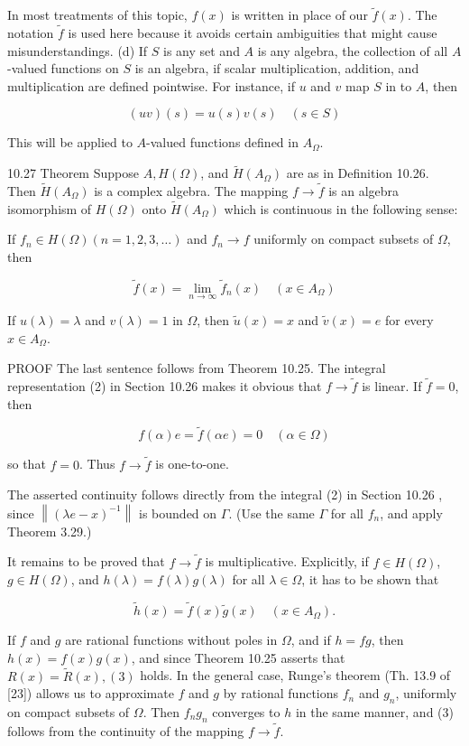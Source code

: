 \documentclass[10pt]{article}
\begin{document}
In most treatments of this topic, $f(x)$ is written in place of our $\tilde{f}(x)$. The notation $\tilde{f}$ is used here because it avoids certain ambiguities that might cause misunderstandings.
(d) If $S$ is any set and $A$ is any algebra, the collection of all $A$-valued functions on $S$ is an algebra, if scalar multiplication, addition, and multiplication are defined pointwise. For instance, if $u$ and $v$ map $S$ in to $A$, then

$$
(u v)(s)=u(s) v(s) \quad(s \in S)
$$

This will be applied to $A$-valued functions defined in $A_{\Omega}$.

10.27 Theorem Suppose $A, H(\Omega)$, and $\tilde{H}\left(A_{\Omega}\right)$ are as in Definition 10.26. Then $\tilde{H}\left(A_{\Omega}\right)$ is a complex algebra. The mapping $f \rightarrow \widetilde{f}$ is an algebra isomorphism of $H(\Omega)$ onto $\widetilde{H}\left(A_{\Omega}\right)$ which is continuous in the following sense:

If $f_{n} \in H(\Omega)(n=1,2,3, \ldots)$ and $f_{n} \rightarrow f$ uniformly on compact subsets of $\Omega$, then

$$
\tilde{f}(x)=\lim _{n \rightarrow \infty} \tilde{f}_{n}(x) \quad\left(x \in A_{\Omega}\right)
$$

If $u(\lambda)=\lambda$ and $v(\lambda)=1$ in $\Omega$, then $\tilde{u}(x)=x$ and $\tilde{v}(x)=e$ for every $x \in A_{\Omega}$.

PROOF The last sentence follows from Theorem 10.25. The integral representation (2) in Section 10.26 makes it obvious that $f \rightarrow \tilde{f}$ is linear. If $\tilde{f}=0$, then

$$
f(\alpha) e=\tilde{f}(\alpha e)=0 \quad(\alpha \in \Omega)
$$

so that $f=0$. Thus $f \rightarrow \tilde{f}$ is one-to-one.

The asserted continuity follows directly from the integral (2) in Section 10.26 , since $\left\|(\lambda e-x)^{-1}\right\|$ is bounded on $\Gamma$. (Use the same $\Gamma$ for all $f_{n}$, and apply Theorem 3.29.)

It remains to be proved that $f \rightarrow \tilde{f}$ is multiplicative. Explicitly, if $f \in H(\Omega)$, $g \in H(\Omega)$, and $h(\lambda)=f(\lambda) g(\lambda)$ for all $\lambda \in \Omega$, it has to be shown that

$$
\tilde{h}(x)=\tilde{f}(x) \tilde{g}(x) \quad\left(x \in A_{\Omega}\right) .
$$

If $f$ and $g$ are rational functions without poles in $\Omega$, and if $h=f g$, then $h(x)=f(x) g(x)$, and since Theorem 10.25 asserts that $R(x)=\widetilde{R}(x),(3)$ holds. In the general case, Runge's theorem (Th. 13.9 of [23]) allows us to approximate $f$ and $g$ by rational functions $f_{n}$ and $g_{n}$, uniformly on compact subsets of $\Omega$. Then $f_{n} g_{n}$ converges to $h$ in the same manner, and (3) follows from the continuity of the mapping $f \rightarrow \tilde{f}$.
\end{document}
